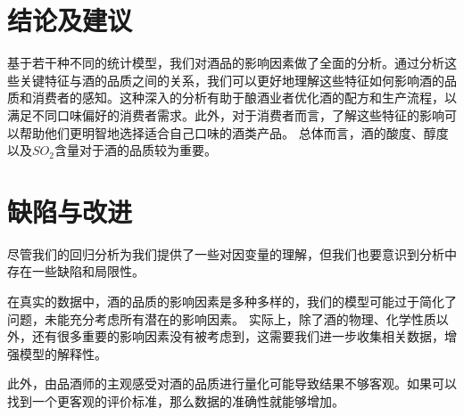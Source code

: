 \documentclass[fontset=ubuntu]{ctexart}
\begin{document}
    \section{结论及建议}
        基于若干种不同的统计模型，我们对酒品的影响因素做了全面的分析。通过分析这些关键特征与酒的品质之间的关系，我们可以更好地理解这些特征如何影响酒的品质和消费者的感知。这种深入的分析有助于酿酒业者优化酒的配方和生产流程，以满足不同口味偏好的消费者需求。此外，对于消费者而言，了解这些特征的影响可以帮助他们更明智地选择适合自己口味的酒类产品。
        总体而言，酒的酸度、醇度以及$SO_2$含量对于酒的品质较为重要。
    
    \section{缺陷与改进}
        尽管我们的回归分析为我们提供了一些对因变量的理解，但我们也要意识到分析中存在一些缺陷和局限性。

        在真实的数据中，酒的品质的影响因素是多种多样的，我们的模型可能过于简化了问题，未能充分考虑所有潜在的影响因素。
        实际上，除了酒的物理、化学性质以外，还有很多重要的影响因素没有被考虑到，这需要我们进一步收集相关数据，增强模型的解释性。

        此外，由品酒师的主观感受对酒的品质进行量化可能导致结果不够客观。如果可以找到一个更客观的评价标准，那么数据的准确性就能够增加。
    \newpage
    
     
\end{document}
